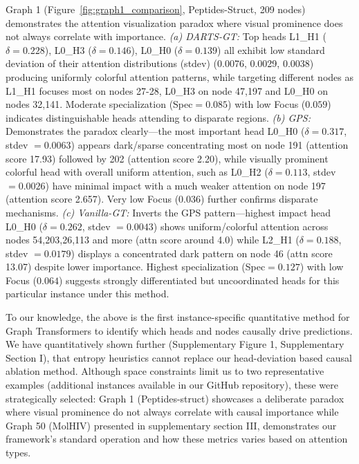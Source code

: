 \documentclass[lettersize,journal]{IEEEtran}
\begin{document}
Graph 1 (Figure~\ref{fig:graph1_comparison}, Peptides-Struct, 209 nodes) demonstrates the attention visualization paradox where visual prominence does not always correlate with importance. \textit{(a) DARTS-GT:} Top heads L1\_H1 ($\delta=0.228$), L0\_H3 ($\delta=0.146$), L0\_H0 ($\delta=0.139$) all exhibit low standard deviation of their attention distributions  (stdev) (0.0076, 0.0029, 0.0038) producing uniformly colorful attention patterns, while targeting different nodes  as L1\_H1 focuses most on nodes 27-28, L0\_H3 on node 47,197 and L0\_H0 on nodes 32,141. Moderate specialization (Spec$=0.085$) with low Focus ($0.059$) indicates distinguishable heads attending to disparate regions.
\textit{(b) GPS:} Demonstrates the paradox clearly—the most important head L0\_H0 ($\delta=0.317$, stdev $=0.0063$) appears dark/sparse concentrating most on node 191 (attention score 17.93) followed by 202 (attention score 2.20), while visually prominent colorful head with overall uniform attention, such as L0\_H2 ($\delta=0.113$, stdev $=0.0026$)  have minimal impact with a much weaker attention on node 197 (attention score 2.657). Very low Focus ($0.036$) further confirms disparate mechanisms.  
\textit{(c) Vanilla-GT: }Inverts the GPS pattern—highest impact head L0\_H0 ($\delta=0.262$, stdev $=0.0043$) shows uniform/colorful attention across nodes 54,203,26,113 and more (attn score around 4.0) while L2\_H1 ($\delta=0.188$, stdev $=0.0179$) displays a concentrated dark pattern on node 46 (attn score 13.07) despite lower importance. Highest specialization (Spec$=0.127$) with low Focus ($0.064$) suggests strongly differentiated but uncoordinated heads for this particular instance under this method.  

  To our knowledge, the above is the first instance-specific quantitative method for Graph Transformers to identify which heads and nodes causally drive predictions. We have quantitatively shown further (Supplementary Figure 1, Supplementary Section I), that entropy heuristics cannot replace our head-deviation based causal ablation method. Although space constraints limit us to two representative examples (additional instances available in our GitHub repository), these were strategically selected: Graph 1 (Peptides-struct) showcases a deliberate paradox where visual prominence do not always correlate with causal importance while Graph 50 (MolHIV) presented in supplementary section III, demonstrates our framework's standard operation and how these metrics varies based on attention types. 
  
\end{document}
